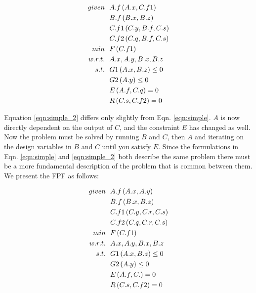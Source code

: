     \begin{align}
        given & \ \ A.f\left(A.x,C.f1\right) \notag
        \\ & \ \  B.f\left(B.x,B.z\right) \notag
        \\ & \ \  C.f1\left(C.y,B.f,C.s\right) \notag
        \\ & \ \  C.f2\left(C.q,B.f,C.s\right) \notag
        \\min &\ \ F\left(C.f1\right) \notag
        \\ w.r.t. &\ \  A.x,A.y,B.x,B.z \notag
        \\ s.t. &\ \ G1\left(A.x,B.z\right) \leq 0 \notag
        \\      &\ \ G2\left(A.y\right) \leq 0 \notag
        \\      &\ \ E\left(A.f,C.q\right) = 0 \notag
        \\      &\ \ R\left(C.s,C.f2\right) = 0 
        \label{eqn:simple_2}
    \end{align}

    Equation \ref{eqn:simple_2} differs only slightly from Eqn. \ref{eqn:simple}. $A$ is now directly dependent on the output of $C$, 
    and the constraint $E$ has changed as well. Now the problem must be solved by running $B$ and $C$, then $A$ and iterating 
    on the design variables in $B$ and $C$ until you satisfy $E$. Since the formulations in Eqn. \ref{eqn:simple} 
    and \ref{eqn:simple_2} both describe the same problem there must be a more fundamental description of the problem that is common
    between them. We present the FPF as follows: 

    \begin{align}
        given & \ \ A.f\left(A.x,A.y\right) \notag
        \\ & \ \  B.f\left(B.x,B.z\right) \notag
        \\ & \ \  C.f1\left(C.y,C.r,C.s\right) \notag
        \\ & \ \  C.f2\left(C.q,C.r,C.s\right) \notag
        \\min &\ \ F\left(C.f1\right) \notag
        \\ w.r.t. &\ \  A.x,A.y,B.x,B.z \notag
        \\ s.t. &\ \ G1\left(A.x,B.z\right) \leq 0 \notag
        \\      &\ \ G2\left(A.y\right) \leq 0 \notag
        \\      &\ \ E\left(A.f,C.\right) = 0 \notag
        \\      &\ \ R\left(C.s,C.f2\right) = 0 
        \label{eqn:simple_2}
    \end{align}


